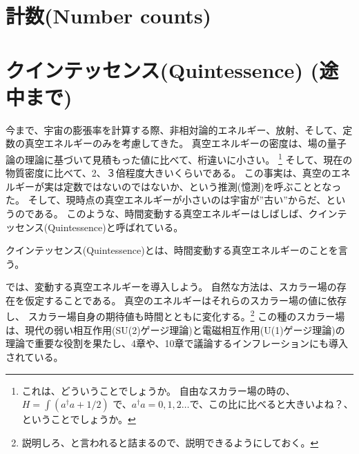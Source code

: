 \documentclass[11pt]{ltjsarticle}
\theoremstyle{plain}
\theoremstyle{break}
\begin{document}
\newpage
\section{計数(Number counts)}\label{sec1-11:Number-counts}
\newpage
\section{クインテッセンス(Quintessence) (途中まで)}\label{sec1-12:Quintessence}

今まで、宇宙の膨張率を計算する際、非相対論的エネルギー、放射、そして、定数の真空エネルギーのみを考慮してきた。
真空エネルギーの密度は、場の量子論の理論に基づいて見積もった値に比べて、桁違いに小さい。
\footnote{これは、どういうことでしょうか。
自由なスカラー場の時の、$H= \int {(a^{\dagger}a +1/2)}$ で、$a^{\dagger}a = 0,1,2 \dots $で、この比に比べると大きいよね？、ということでしょうか。}
そして、現在の物質密度に比べて、2、３倍程度大きいくらいである。
この事実は、真空のエネルギーが実は定数ではないのではないか、という推測(憶測)を呼ぶこととなった。
そして、現時点の真空エネルギーが小さいのは宇宙が”古い”からだ、というのである。
このような、時間変動する真空エネルギーはしばしば、クインテッセンス(Quintessence)と呼ばれている。
\begin{definition}
クインテッセンス(Quintessence)とは、時間変動する真空エネルギーのことを言う。
\end{definition}

では、変動する真空エネルギーを導入しよう。
自然な方法は、スカラー場の存在を仮定することである。
真空のエネルギーはそれらのスカラー場の値に依存し、
スカラー場自身の期待値も時間とともに変化する。\footnote{説明しろ、と言われると詰まるので、説明できるようにしておく。}
この種のスカラー場は、現代の弱い相互作用(SU(2)ゲージ理論)と電磁相互作用(U(1)ゲージ理論)の理論で重要な役割を果たし、4章や、10章で議論するインフレーションにも導入されている。
\end{document}
